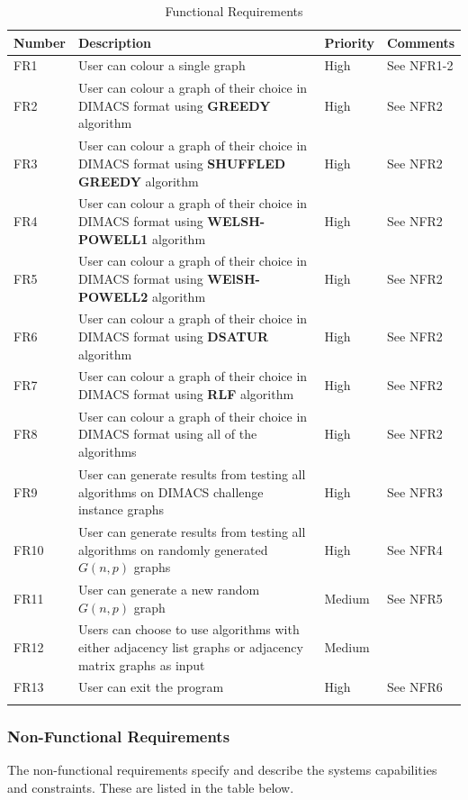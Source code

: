\begin{longtable}{|m{}|m{}|m{}|m{}|}
    \hline
    \textbf{Number} &  \textbf{Description} & \textbf{Priority} & \textbf{Comments} \\
    \hline
    FR1 & User can colour a single graph & High & See NFR1-2 \\
    \hline
     FR2 & User can colour a graph of their choice in DIMACS format using \textbf{GREEDY} algorithm & High & See NFR2 \\
     \hline
     FR3 & User can colour a graph of their choice in DIMACS format using \textbf{SHUFFLED GREEDY} algorithm & High & See NFR2 \\
     \hline
     FR4 & User can colour a graph of their choice in DIMACS format using \textbf{WELSH-POWELL1} algorithm & High & See NFR2 \\
     \hline
     FR5 & User can colour a graph of their choice in DIMACS format using \textbf{WElSH-POWELL2} algorithm & High & See NFR2 \\
     \hline
     FR6 & User can colour a graph of their choice in DIMACS format using \textbf{DSATUR} algorithm & High & See NFR2 \\
     \hline
     FR7 & User can colour a graph of their choice in DIMACS format using \textbf{RLF} algorithm & High & See NFR2 \\
     \hline
     FR8 & User can colour a graph of their choice in DIMACS format using all of the algorithms & High & See NFR2 \\
     \hline
     FR9 & User can generate results from testing all algorithms on DIMACS challenge instance graphs & High & See NFR3\\
     \hline
     FR10 & User can generate results from testing all algorithms on randomly generated $G(n, p)$ graphs & High & See NFR4\\
     \hline
     FR11 & User can generate a new random $G(n, p)$ graph & Medium & See NFR5 \\
    \hline
    FR12 & Users can choose to use algorithms with either adjacency list graphs or adjacency matrix graphs as input & Medium & \\
     \hline
     FR13 & User can exit the program & High & See NFR6\\
     \hline
\caption{Functional Requirements}
\label{tab:FuncReqs}  
\end{longtable}
  

\subsubsection{Non-Functional Requirements}
The non-functional requirements specify and describe the systems capabilities and constraints. These are listed in the table below. 


